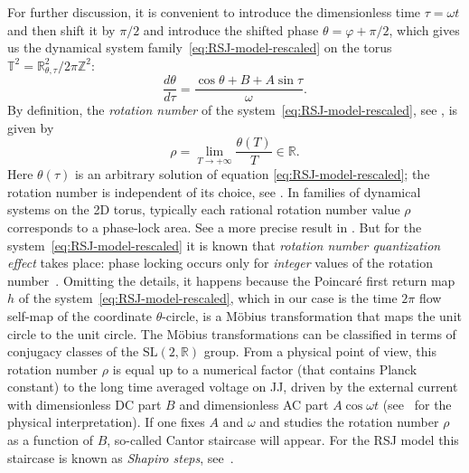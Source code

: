 \documentclass[preprint,12pt]{elsarticle}
\theoremstyle{plain}
\renewcommand{\phi}{\varphi}
\numberwithin{equation}{section}
\numberwithin{equation}{section}
\begin{document}
For further discussion, it is convenient to introduce the dimensionless time $\tau=\omega t$ and then shift it by $\pi/2$ and introduce the shifted phase $\theta=\phi+\pi/2$, which gives us the dynamical system family~\eqref{eq:RSJ-model-rescaled} on the torus $\mathbb T^2=\mathbb R^2_{\theta,\tau}\slash2\pi\mathbb Z^2$:  
\begin{equation*}
    \frac{d\theta}{d\tau}=\frac{\cos\theta+B+A\sin\tau}{\omega}.
\end{equation*}
 By definition, the \emph{rotation number} of the system~\eqref{eq:RSJ-model-rescaled}, see \cite{arn}, is given by
\begin{equation*}
    \rho=\lim\limits_{T\rightarrow+\infty}\frac{\theta(T)}{T}\in\mathbb{R}.
\end{equation*}
Here $\theta(\tau)$ is an arbitrary solution of equation \eqref{eq:RSJ-model-rescaled}; the rotation number is independent of its choice, see \cite{arn}. 
In families of dynamical systems on the 2D torus, typically each rational rotation number value $\rho$ corresponds to a phase-lock area. See a more precise result in \cite{glutryb}. But for the system~\eqref{eq:RSJ-model-rescaled} it is known that \emph{rotation number quantization effect} takes place: phase locking occurs only for \emph{integer} values of the rotation number~\cite{buchstaber2010rotation}. Omitting the details, it happens because the Poincar\'{e} first return map $h$ of the system~\eqref{eq:RSJ-model-rescaled}, which in our case is the time $2\pi$ flow self-map of the coordinate $\theta$-circle, is a M\"{o}bius transformation that maps the unit circle to the unit circle. The M\"{o}bius transformations can be classified in terms of conjugacy classes of the $\mathrm{SL}(2,\mathbb{R})$ group. From a physical point of view, this rotation number $\rho$ is equal up to a numerical factor (that contains Planck constant) to the long time averaged voltage on JJ, driven by the external current with dimensionless DC part $B$ and dimensionless AC part $A\cos\omega t$ (see~\cite{renne1974some,waldram1982alternative} for the physical interpretation). If one fixes $A$ and $\omega$ and studies the rotation number $\rho$ as a function of $B$, so-called Cantor staircase will appear. For the RSJ model this staircase is known as \emph{Shapiro steps}, see~\cite{shapiro1963josephson}.
\end{document}
